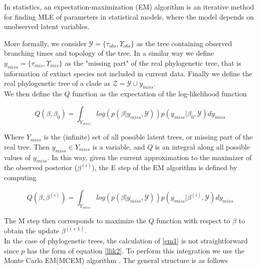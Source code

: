 In statistics, an expectation-maximization (EM) \cite{em} algorithm is an iterative method for finding MLE of parameters in statistical models, where the model depends on unobserved latent variables. 


 More formally, we consider $\mathcal{Y} = \{\tau_{obs},\Upsilon_{obs}\}$ as the tree containing observed branching times and topology of the tree. In a similar way we define $y_{miss} = \{\tau_{mis},\Upsilon_{mis}\}$ as the "missing part" of the real phylogenetic tree, that is information of extinct species not included in current data. Finally we define the real phylogenetic tree of a clade as $\mathcal{Z} = \mathcal{Y} \cup y_{miss}$. \\
 
We then define the $Q$ function as the expectation of the log-likelihood function 
 
 $$ Q(\beta,\beta_0) = \int_{Y_{miss}} log(p(\beta | y_{miss}, \mathcal{Y}))p(y_{miss} | \beta_0, \mathcal{Y}) dy_{miss} $$
 

Where $Y_{miss}$ is the (infinite) set of all possible latent trees, or missing part of the real tree. Then $y_{miss} \in Y_{miss}$ is a variable, and $Q$ is an integral along all possible values of $y_{miss}$. In this way, given the current approximation to the maximizer of the observed posterior ($\beta^{(i)}$), the E step of the EM algorithm is defined by computing

\begin{equation}
 Q(\beta,\beta^{(i)})=\int_{Y_{miss}} log(p(\beta | y_{miss},\mathcal{Y}))p(y_{miss} |\beta^{(i)},\mathcal{Y})dy_{miss} 
 \label{em1}
 \end{equation}

The M step then corresponds to maximize the $Q$ function with respect to $\beta$ to obtain the update $\beta^{(i+1)}$. \\

In the case of phylogenetic trees, the calculation of \ref{em1} is not straightforward since $p$ has the form of equation \ref{llik2}. To perform this integration we use the Monte Carlo EM(MCEM) algorithm \cite{mcem}. The general structure is as follows

